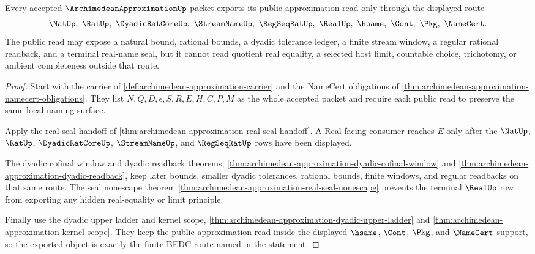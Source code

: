 \begin{theorem}
\label{thm:archimedean-approximation-public-finite-export}
Every accepted $\ArchimedeanApproximationUp$ packet exports its public approximation read only through the displayed route
$$
\NatUp,\ \RatUp,\ \DyadicRatCoreUp,\ \StreamNameUp,\ \RegSeqRatUp,\ \RealUp,\ \hsame,\ \Cont,\ \Pkg,\ \NameCert .
$$
The public read may expose a natural bound, rational bounds, a dyadic tolerance ledger, a finite stream window, a regular rational readback, and a terminal real-name seal, but it cannot read quotient real equality, a selected host limit, countable choice, trichotomy, or ambient completeness outside that route.
\end{theorem}
\begin{proof}
Start with the carrier of \autoref{def:archimedean-approximation-carrier} and the NameCert obligations of \autoref{thm:archimedean-approximation-namecert-obligations}. They list $N,Q,D,\epsilon,S,R,E,H,C,P,M$ as the whole accepted packet and require each public read to preserve the same local naming surface.

Apply the real-seal handoff of \autoref{thm:archimedean-approximation-real-seal-handoff}. A Real-facing consumer reaches $E$ only after the $\NatUp$, $\RatUp$, $\DyadicRatCoreUp$, $\StreamNameUp$, and $\RegSeqRatUp$ rows have been displayed.

The dyadic cofinal window and dyadic readback theorems, \autoref{thm:archimedean-approximation-dyadic-cofinal-window} and \autoref{thm:archimedean-approximation-dyadic-readback}, keep later bounds, smaller dyadic tolerances, rational bounds, finite windows, and regular readbacks on that same route. The seal nonescape theorem \autoref{thm:archimedean-approximation-real-seal-nonescape} prevents the terminal $\RealUp$ row from exporting any hidden real-equality or limit principle.

Finally use the dyadic upper ladder and kernel scope, \autoref{thm:archimedean-approximation-dyadic-upper-ladder} and \autoref{thm:archimedean-approximation-kernel-scope}. They keep the public approximation read inside the displayed $\hsame$, $\Cont$, $\Pkg$, and $\NameCert$ support, so the exported object is exactly the finite BEDC route named in the statement.
\end{proof}

